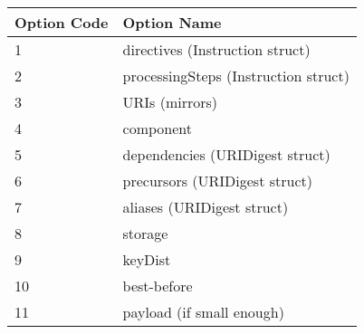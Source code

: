 \begin{longtable}[]{@{}ll@{}}
\toprule
Option Code & Option Name\tabularnewline
\midrule
\endhead
1 & directives (Instruction struct)\tabularnewline
2 & processingSteps (Instruction struct)\tabularnewline
3 & URIs (mirrors)\tabularnewline
4 & component\tabularnewline
5 & dependencies (URIDigest struct)\tabularnewline
6 & precursors (URIDigest struct)\tabularnewline
7 & aliases (URIDigest struct)\tabularnewline
8 & storage\tabularnewline
9 & keyDist\tabularnewline
10 & best-before\tabularnewline
11 & payload (if small enough)\tabularnewline
\bottomrule
\end{longtable}
